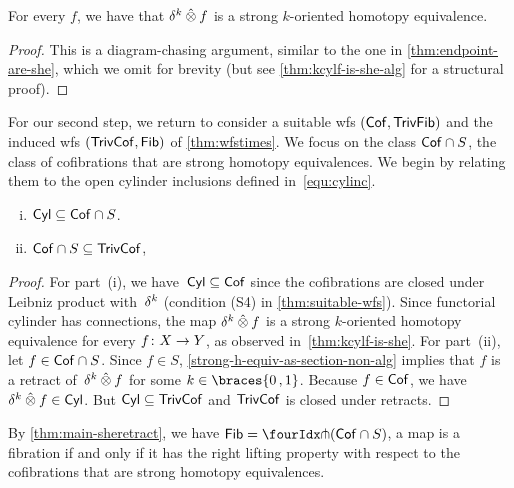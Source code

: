 \documentclass[reqno,10pt,a4paper,oneside,draft]{amsart}
\begin{document}
{{\begin{lemma} \label{thm:kcylf-is-she}
For every $f$, we have that $\delta^k \mathbin{\hat{\otimes}} f$ is a strong $k$-oriented homotopy equivalence.
\end{lemma}

\begin{proof}
This is a diagram-chasing argument, similar to the one in \cref{thm:endpoint-are-she}, which we omit for brevity (but see \cref{thm:kcylf-is-she-alg} for a structural proof).
\end{proof}

For our second step, we return to consider a suitable wfs $(\mathsf{Cof}, \mathsf{TrivFib})$ and the induced wfs $(\mathsf{TrivCof}, \mathsf{Fib})$ of \cref{thm:wfstimes}.
We focus on the class $\mathsf{Cof} \cap S$, \ie the class of cofibrations that are strong homotopy equivalences.
We begin by relating them to the open cylinder inclusions defined in~\eqref{equ:cylinc}.

\begin{lemma} \label{thm:main-sheretract} \leavevmode
\begin{enumerate}[(i)]
\item $\mathsf{Cyl} \subseteq \mathsf{Cof} \cap S$.
\item $\mathsf{Cof} \cap S \subseteq \mathsf{TrivCof}$,
\end{enumerate}
\end{lemma}

\begin{proof}
For part~(i), we have~$\mathsf{Cyl} \subseteq \mathsf{Cof}$ since the cofibrations are closed under Leibniz product with~$\delta^k$ (condition (S4) in \cref{thm:suitable-wfs}).
Since functorial cylinder has connections, the map $\delta^k \mathbin{\hat{\otimes}} f$ is a strong $k$-oriented homotopy equivalence for every $f \colon X \to Y$, as observed in~\cref{thm:kcylf-is-she}.
For part~(ii), let $f \in \mathsf{Cof} \cap S$.
Since $f \in S$, \cref{strong-h-equiv-as-section-non-alg} implies that $f$ is a retract of~$\delta^k \mathbin{\hat{\otimes}} f$ for some $k \in \braces{0\,, 1}$.
Because $f \in \mathsf{Cof}$, we have $\delta^k \mathbin{\hat{\otimes}} f \in \mathsf{Cyl}$.
But $\mathsf{Cyl} \subseteq \mathsf{TrivCof}$ and $\mathsf{TrivCof}$ is closed under retracts.
\end{proof}

\begin{remark} \label{fib-and-she}
By \cref{thm:main-sheretract}, we have $\Fib = \liftr{(\Cof \cap S)}$, \ie a map is a fibration if and only if it has the right lifting property with respect to the cofibrations that are strong homotopy equivalences.
\end{remark}

}}
\end{document}
